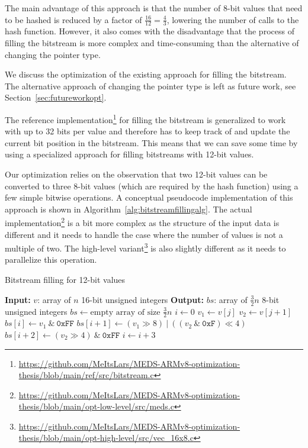 \documentclass[11pt,a4paper]{report}
\theoremstyle{definition}
\begin{document}
The main advantage of this approach is that the number of 8-bit values that need to be hashed is reduced by a factor of $\frac{16}{12} = \frac{4}{3}$, lowering the number of calls to the hash function. However, it also comes with the disadvantage that the process of filling the bitstream is more complex and time-consuming than the alternative of changing the pointer type.

We discuss the optimization of the existing approach for filling the bitstream. The alternative approach of changing the pointer type is left as future work, see Section~\ref{sec:futureworkopt}.

The reference implementation\footnote{\url{https://github.com/MeItsLars/MEDS-ARMv8-optimization-thesis/blob/main/ref/src/bitstream.c}} for filling the bitstream is generalized to work with up to 32 bits per value and therefore has to keep track of and update the current bit position in the bitstream. This means that we can save some time by using a specialized approach for filling bitstreams with 12-bit values.

Our optimization relies on the observation that two 12-bit values can be converted to three 8-bit values (which are required by the hash function) using a few simple bitwise operations. A conceptual pseudocode implementation of this approach is shown in Algorithm~\ref{alg:bitstreamfillingalg}. The actual implementation\footnote{\url{https://github.com/MeItsLars/MEDS-ARMv8-optimization-thesis/blob/main/opt-low-level/src/meds.c}} is a bit more complex as the structure of the input data is different and it needs to handle the case where the number of values is not a multiple of two. The high-level variant\footnote{\url{https://github.com/MeItsLars/MEDS-ARMv8-optimization-thesis/blob/main/opt-high-level/src/vec\_16x8.c}} is also slightly different as it needs to parallelize this operation.

\begin{algorithm}
  \caption{Bitstream filling for 12-bit values}
  \label{alg:bitstreamfillingalg}
  \begin{algorithmic}[1]
    \State \textbf{Input:} $v$: array of $n$ 16-bit unsigned integers
    \State \textbf{Output:} $bs$: array of $\frac{3}{2}n$ 8-bit unsigned integers
    \State $bs \gets \text{empty array of size } \frac{3}{2}n$
    \State $i \gets 0$
    \State $v_1 \gets v[j]$
    \State $v_2 \gets v[j + 1]$
    \State $bs[i] \gets v_1 ~\&~ \texttt{0xFF}$
    \State $bs[i + 1] \gets (v_1 \gg 8) ~|~ ((v_2 ~\&~ \texttt{0xF}) \ll 4)$
    \State $bs[i + 2] \gets (v_2 \gg 4) ~\&~ \texttt{0xFF}$
    \State $i \gets i + 3$
    \EndFor
  \end{algorithmic}
\end{algorithm}
\end{document}
